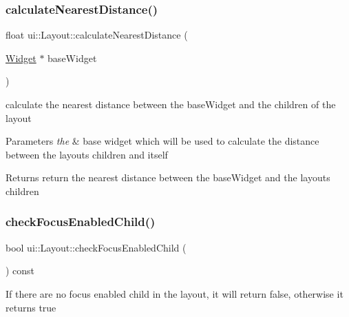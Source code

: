 \subsubsection{\texorpdfstring{calculate\+Nearest\+Distance()}{calculateNearestDistance()}\hspace{0.1cm}{\footnotesize\ttfamily [2/2]}}
{\footnotesize\ttfamily float ui\+::\+Layout\+::calculate\+Nearest\+Distance (\begin{DoxyParamCaption}\item[{\hyperlink{classui_1_1Widget}{Widget} $\ast$}]{base\+Widget }\end{DoxyParamCaption})\hspace{0.3cm}{\ttfamily [protected]}}

calculate the nearest distance between the base\+Widget and the children of the layout 
\begin{DoxyParams}{Parameters}
{\em the} & base widget which will be used to calculate the distance between the layout\textquotesingle{}s children and itself \\
\hline
\end{DoxyParams}
\begin{DoxyReturn}{Returns}
return the nearest distance between the base\+Widget and the layout\textquotesingle{}s children 
\end{DoxyReturn}
\mbox{\label{classui_1_1Layout_a54ff2aaad412b2ac3503fb75d9cb34bf}} 
\subsubsection{\texorpdfstring{check\+Focus\+Enabled\+Child()}{checkFocusEnabledChild()}\hspace{0.1cm}{\footnotesize\ttfamily [1/2]}}
{\footnotesize\ttfamily bool ui\+::\+Layout\+::check\+Focus\+Enabled\+Child (\begin{DoxyParamCaption}{ }\end{DoxyParamCaption}) const\hspace{0.3cm}{\ttfamily [protected]}}

If there are no focus enabled child in the layout, it will return false, otherwise it returns true \mbox{\label{classui_1_1Layout_a54ff2aaad412b2ac3503fb75d9cb34bf}} 
